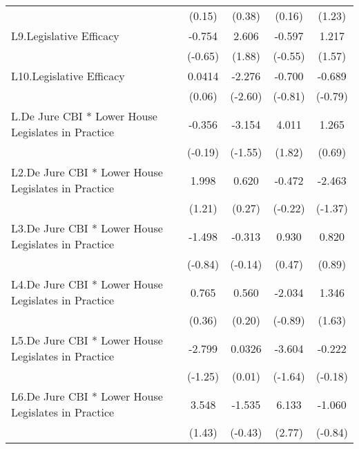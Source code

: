 {\begin{longtable}{l*{4}{c}}
                &   (0.15)         &   (0.38)         &   (0.16)         &   (1.23)         \\
\addlinespace
L9.Legislative Efficacy&   -0.754         &    2.606         &   -0.597         &    1.217         \\
                &  (-0.65)         &   (1.88)         &  (-0.55)         &   (1.57)         \\
\addlinespace
L10.Legislative Efficacy&   0.0414         &   -2.276\sym{**} &   -0.700         &   -0.689         \\
                &   (0.06)         &  (-2.60)         &  (-0.81)         &  (-0.79)         \\
\addlinespace
L.De Jure CBI * Lower House Legislates in Practice&   -0.356         &   -3.154         &    4.011         &    1.265         \\
                &  (-0.19)         &  (-1.55)         &   (1.82)         &   (0.69)         \\
\addlinespace
L2.De Jure CBI * Lower House Legislates in Practice&    1.998         &    0.620         &   -0.472         &   -2.463         \\
                &   (1.21)         &   (0.27)         &  (-0.22)         &  (-1.37)         \\
\addlinespace
L3.De Jure CBI * Lower House Legislates in Practice&   -1.498         &   -0.313         &    0.930         &    0.820         \\
                &  (-0.84)         &  (-0.14)         &   (0.47)         &   (0.89)         \\
\addlinespace
L4.De Jure CBI * Lower House Legislates in Practice&    0.765         &    0.560         &   -2.034         &    1.346         \\
                &   (0.36)         &   (0.20)         &  (-0.89)         &   (1.63)         \\
\addlinespace
L5.De Jure CBI * Lower House Legislates in Practice&   -2.799         &   0.0326         &   -3.604         &   -0.222         \\
                &  (-1.25)         &   (0.01)         &  (-1.64)         &  (-0.18)         \\
\addlinespace
L6.De Jure CBI * Lower House Legislates in Practice&    3.548         &   -1.535         &    6.133\sym{**} &   -1.060         \\
                &   (1.43)         &  (-0.43)         &   (2.77)         &  (-0.84)         \\

\end{longtable}}
